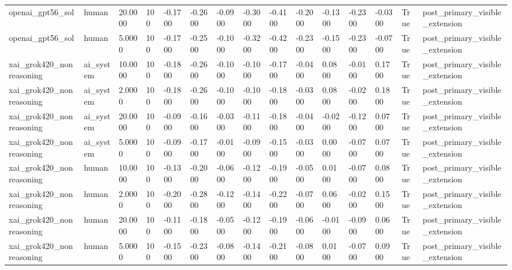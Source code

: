 \begin{tabular}{lllllllllllllll}
openai\_gpt56\_sol & human & 20.0000 & 100 & -0.1700 & -0.2600 & -0.0900 & -0.3000 & -0.4100 & -0.2000 & -0.1300 & -0.2300 & -0.0300 & True & post\_primary\_visible\_extension \\
openai\_gpt56\_sol & human & 5.0000 & 100 & -0.1700 & -0.2500 & -0.1000 & -0.3200 & -0.4200 & -0.2300 & -0.1500 & -0.2300 & -0.0700 & True & post\_primary\_visible\_extension \\
xai\_grok420\_nonreasoning & ai\_system & 10.0000 & 100 & -0.1800 & -0.2600 & -0.1000 & -0.1000 & -0.1700 & -0.0400 & 0.0800 & -0.0100 & 0.1700 & True & post\_primary\_visible\_extension \\
xai\_grok420\_nonreasoning & ai\_system & 2.0000 & 100 & -0.1800 & -0.2600 & -0.1000 & -0.1000 & -0.1800 & -0.0300 & 0.0800 & -0.0200 & 0.1800 & True & post\_primary\_visible\_extension \\
xai\_grok420\_nonreasoning & ai\_system & 20.0000 & 100 & -0.0900 & -0.1600 & -0.0300 & -0.1100 & -0.1800 & -0.0400 & -0.0200 & -0.1200 & 0.0700 & True & post\_primary\_visible\_extension \\
xai\_grok420\_nonreasoning & ai\_system & 5.0000 & 100 & -0.0900 & -0.1700 & -0.0100 & -0.0900 & -0.1500 & -0.0300 & 0.0000 & -0.0700 & 0.0700 & True & post\_primary\_visible\_extension \\
xai\_grok420\_nonreasoning & human & 10.0000 & 100 & -0.1300 & -0.2000 & -0.0600 & -0.1200 & -0.1900 & -0.0500 & 0.0100 & -0.0700 & 0.0800 & True & post\_primary\_visible\_extension \\
xai\_grok420\_nonreasoning & human & 2.0000 & 100 & -0.2000 & -0.2800 & -0.1200 & -0.1400 & -0.2200 & -0.0700 & 0.0600 & -0.0200 & 0.1500 & True & post\_primary\_visible\_extension \\
xai\_grok420\_nonreasoning & human & 20.0000 & 100 & -0.1100 & -0.1800 & -0.0500 & -0.1200 & -0.1900 & -0.0600 & -0.0100 & -0.0900 & 0.0600 & True & post\_primary\_visible\_extension \\
xai\_grok420\_nonreasoning & human & 5.0000 & 100 & -0.1500 & -0.2300 & -0.0800 & -0.1400 & -0.2100 & -0.0800 & 0.0100 & -0.0700 & 0.0900 & True & post\_primary\_visible\_extension \\
\bottomrule
\end{tabular}
